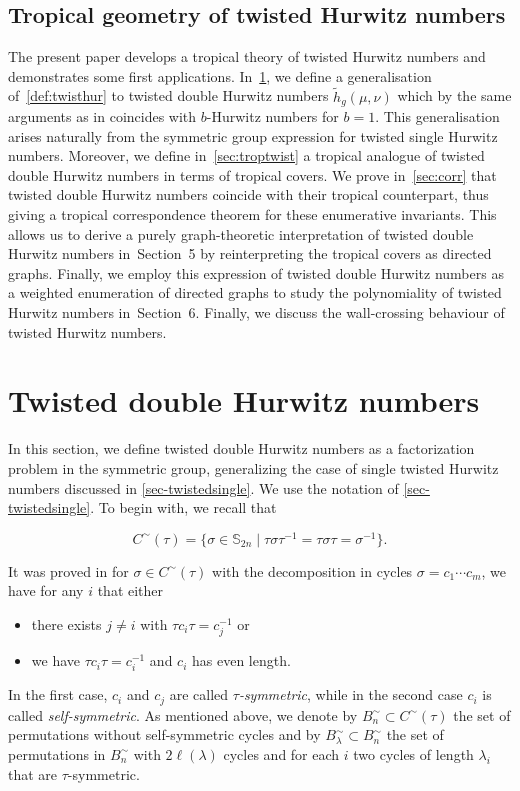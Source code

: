 \documentclass[11pt]{article}
\theoremstyle{definition}
\numberwithin{equation}{section}
\begin{document}
\subsection{Tropical geometry of twisted Hurwitz numbers} 
The present paper develops a tropical theory of twisted Hurwitz numbers and demonstrates some first applications. In~\cref{sec:twistdoub}, we define a generalisation of~\cref{def:twisthur} to twisted double Hurwitz numbers $\tilde{h}_g(\mu,\nu)$ which by the same arguments as in \cite[Theorem 3.2]{BF21} coincides with $b$-Hurwitz numbers for $b=1$. This generalisation arises naturally from the symmetric group expression for twisted single Hurwitz numbers. Moreover, we define in~\cref{sec:troptwist} a tropical analogue of twisted double Hurwitz numbers in terms of tropical covers. We prove in~\cref{sec:corr} that twisted double Hurwitz numbers coincide with their tropical counterpart, thus giving a tropical correspondence theorem for these enumerative invariants. This allows us to derive a purely graph-theoretic interpretation of twisted double Hurwitz numbers in~Section~5 by reinterpreting the tropical covers as directed graphs.
Finally, we employ this expression of twisted double Hurwitz numbers as a weighted enumeration of directed graphs to study the polynomiality of twisted Hurwitz numbers in~Section~6. Finally, we discuss the wall-crossing behaviour of twisted Hurwitz numbers.

\section{Twisted double Hurwitz numbers}
\label{sec:twistdoub}
In this section, we define twisted double Hurwitz numbers as a factorization problem in the symmetric group, generalizing the case of single twisted Hurwitz numbers discussed in \cref{sec-twistedsingle}. We use the notation of \cref{sec-twistedsingle}. To begin with, we recall that

\begin{equation*}
     C^\sim(\tau)=\{\sigma\in \mathbb{S}_{2n}  \mid  \tau \sigma \tau^{-1} = \tau \sigma \tau =  \sigma^{-1}\}.
\end{equation*}

It was proved in \cite[Lemma 2.1]{BF21} for $\sigma \in C^\sim(\tau)$ with the decomposition in cycles $\sigma=c_1\cdots c_m$, we have for any $i$ that either
\begin{itemize}
    \item there exists $j\neq i$ with $\tau c_i\tau=c_j^{-1}$ or
    \item we have $\tau c_i\tau=c_i^{-1}$ and $c_i$ has even length.
\end{itemize}
In the first case, $c_i$ and $c_j$ are called \textit{$\tau$-symmetric}, while in the second case $c_i$ is called \textit{self-symmetric}. As mentioned above, we denote by $B_n^\sim\subset C^\sim(\tau)$ the set of permutations without self-symmetric cycles and by $B^\sim_\lambda\subset B^\sim_n$ the set of permutations in $B^\sim_n$ with $2\ell(\lambda)$ cycles and for each $i$ two cycles of length $\lambda_i$ that are $\tau$-symmetric.
\end{document}
